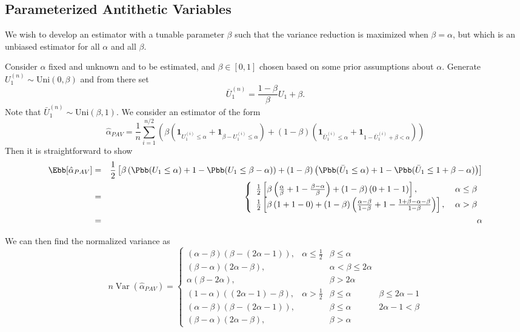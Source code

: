 \documentclass[10pt]{article}
\DeclareMathOperator{\var}{Var}
\begin{document}
\subsection{Parameterized Antithetic Variables}
We wish to develop an estimator with a tunable parameter $\beta$ such that the variance reduction is maximized when $\beta=\alpha$, but which is an unbiased estimator for all $\alpha$ and all $\beta$.

Consider $\alpha$ fixed and unknown and to be estimated, and $\beta \in [0,1]$ chosen based on some prior assumptions about $\alpha$. Generate $U_{1}^{(n)} \sim \mathrm{Uni}(0,\beta)$ and from there set
\begin{equation}
\bar{U}_{1}^{(n)} = \frac{1-\beta}{\beta} U_1 + \beta.
\end{equation}
Note that $\bar{U}_{1}^{(n)} \sim \mathrm{Uni}(\beta,1)$. We consider an estimator of the form
\begin{equation}
\hat{\alpha}_{PAV} = \frac{1}{n} \sum_{i=1}^{n/2} \left( \beta \left( \mathbf{1}_{U_{1}^{(i)} \leq \alpha} + \mathbf{1}_{\beta-U_{1}^{(i)} \leq \alpha} \right) + (1-\beta) \left( \mathbf{1}_{\bar{U}_{1}^{(i)} \leq \alpha} + \mathbf{1}_{1-\bar{U}_{1}^{(i)} + \beta < \alpha} \right) \right)
\end{equation}
Then it is straightforward to show
\begin{eqnarray}
\Ebb[\hat{\alpha}_{PAV}] &=& \frac{1}{2} \left[ \beta \left( \Pbb(U_1 \leq \alpha) + 1 - \Pbb(U_1 \leq \beta - \alpha) \right) + (1-\beta) \left( \Pbb(\bar{U}_1 \leq \alpha) + 1 - \Pbb( \bar{U}_1 \leq 1+ \beta - \alpha) \right) \right] \nonumber \\
&=& \left\{ \begin{array}{ll}
\frac{1}{2} \left[ \beta \left( \frac{\alpha}{\beta} + 1 - \frac{\beta-\alpha}{\beta} \right) + (1-\beta) \left(0 + 1 - 1 \right) \right] , \; & \alpha \leq \beta \\
\frac{1}{2} \left[ \beta \left(1 + 1 - 0 \right) + (1-\beta) \left( \frac{\alpha-\beta}{1-\beta} + 1 - \frac{1+\beta-\alpha-\beta}{1-\beta} \right) \right], \; & \alpha > \beta 
\end{array} \right. \nonumber \\
&=& \alpha
\end{eqnarray}

We can then find the normalized variance as
\begin{equation}n\var(\hat{\alpha}_{PAV}) = \left\{
\begin{array}{llll}
(\alpha-\beta)(\beta-(2\alpha-1)), & \alpha \leq \frac{1}{2} & \beta \leq \alpha & \\
(\beta-\alpha)(2\alpha-\beta), & & \alpha < \beta \leq 2 \alpha &  \\
\alpha(\beta-2\alpha), & & \beta > 2 \alpha & \\
(1-\alpha)((2\alpha-1)-\beta), & \alpha > \frac{1}{2} & \beta \leq \alpha & \beta \leq 2 \alpha - 1 \\
(\alpha-\beta)(\beta - (2\alpha-1)), & & \beta \leq \alpha & 2 \alpha - 1 < \beta \\
(\beta-\alpha)(2\alpha-\beta), & & \beta > \alpha 
\end{array}\right.
\end{equation}
\end{document}
